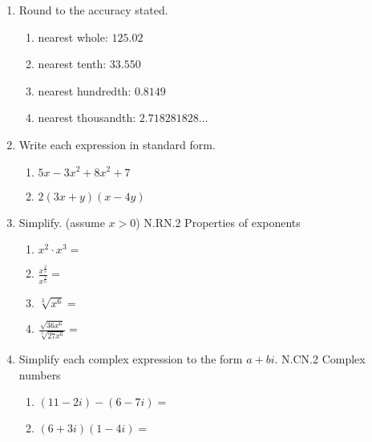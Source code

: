 \documentclass[12pt, twoside]{article}
\begin{document}
\begin{enumerate}[itemsep=0.5cm]
\newpage
\item Round to the accuracy stated.
    \begin{multicols}{2}
    \begin{enumerate}[itemsep=1cm]
        \item nearest whole: $125.02$
        \item nearest tenth: $33.550$
        \item nearest hundredth: $0.8149$
        \item nearest thousandth: $2.718281828 \dots$
    \end{enumerate}
    \end{multicols} \vspace{0.5cm}

\item Write each expression in standard form.
    \begin{multicols}{2}
    \begin{enumerate}[itemsep=0.5cm]
        \item $5x-3x^2+8x^2+7$
        \item $2(3x+y)(x-4y)$
    \end{enumerate}
    \end{multicols} \vspace{4cm}

\item Simplify. (assume $x > 0$) \hfill N.RN.2 Properties of exponents
    \begin{multicols}{2}
    \begin{enumerate}[itemsep=1cm]
        \item $x^2 \cdot x^3 =$
        \item $\displaystyle \frac{x^{\frac{2}{3}}}{x^{\frac{1}{6}}} =$
        \item $\sqrt[3]{x^6} =$
        \item $\displaystyle \frac{\sqrt{36x^6}}{\sqrt[3]{27x^6}} = $
    \end{enumerate}
    \end{multicols} \vspace{1cm}


\item Simplify each complex expression to the form $a+bi$. \hfill N.CN.2 Complex numbers
    \begin{multicols}{2}
    \begin{enumerate}
        \item $(11-2i) - (6-7i)=$
        \item $(6+3i)(1-4i)=$
    \end{enumerate}
    \end{multicols} \vspace{3cm}


\end{enumerate}
\end{document}

